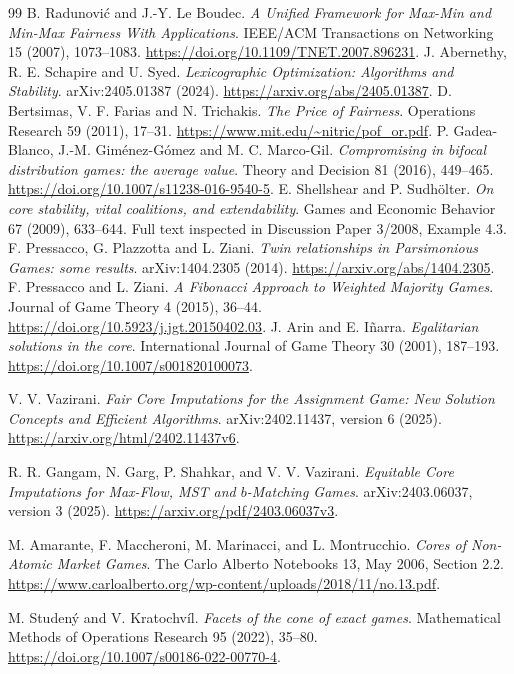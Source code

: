 \documentclass[11pt]{article}
\begin{document}
\begin{thebibliography}{99}
B. Radunovi\'c and J.-Y. Le Boudec.
\emph{A Unified Framework for Max-Min and Min-Max Fairness With Applications}.
IEEE/ACM Transactions on Networking 15 (2007), 1073--1083.
\url{https://doi.org/10.1109/TNET.2007.896231}.
J. Abernethy, R. E. Schapire and U. Syed.
\emph{Lexicographic Optimization: Algorithms and Stability}.
arXiv:2405.01387 (2024). \url{https://arxiv.org/abs/2405.01387}.
D. Bertsimas, V. F. Farias and N. Trichakis.
\emph{The Price of Fairness}. Operations Research 59 (2011), 17--31.
\url{https://www.mit.edu/~nitric/pof_or.pdf}.
P. Gadea-Blanco, J.-M. Gim\'enez-G\'omez and M. C. Marco-Gil.
\emph{Compromising in bifocal distribution games: the average value}.
Theory and Decision 81 (2016), 449--465.
\url{https://doi.org/10.1007/s11238-016-9540-5}.
E. Shellshear and P. Sudh\"olter.
\emph{On core stability, vital coalitions, and extendability}.
Games and Economic Behavior 67 (2009), 633--644.
Full text inspected in Discussion Paper 3/2008, Example 4.3.
F. Pressacco, G. Plazzotta and L. Ziani.
\emph{Twin relationships in Parsimonious Games: some results}.
arXiv:1404.2305 (2014). \url{https://arxiv.org/abs/1404.2305}.
F. Pressacco and L. Ziani.
\emph{A Fibonacci Approach to Weighted Majority Games}.
Journal of Game Theory 4 (2015), 36--44.
\url{https://doi.org/10.5923/j.jgt.20150402.03}.
J. Arin and E. I\~narra.
\emph{Egalitarian solutions in the core}.
International Journal of Game Theory 30 (2001), 187--193.
\url{https://doi.org/10.1007/s001820100073}.

V. V. Vazirani.
\emph{Fair Core Imputations for the Assignment Game: New Solution Concepts
and Efficient Algorithms}.
arXiv:2402.11437, version 6 (2025).
\url{https://arxiv.org/html/2402.11437v6}.

R. R. Gangam, N. Garg, P. Shahkar, and V. V. Vazirani.
\emph{Equitable Core Imputations for Max-Flow, MST and $b$-Matching Games}.
arXiv:2403.06037, version 3 (2025).
\url{https://arxiv.org/pdf/2403.06037v3}.

M. Amarante, F. Maccheroni, M. Marinacci, and L. Montrucchio.
\emph{Cores of Non-Atomic Market Games}.
The Carlo Alberto Notebooks 13, May 2006, Section 2.2.
\url{https://www.carloalberto.org/wp-content/uploads/2018/11/no.13.pdf}.

M. Studen\'y and V. Kratochv\'il.
\emph{Facets of the cone of exact games}.
Mathematical Methods of Operations Research 95 (2022), 35--80.
\url{https://doi.org/10.1007/s00186-022-00770-4}.
\end{thebibliography}
\end{document}
